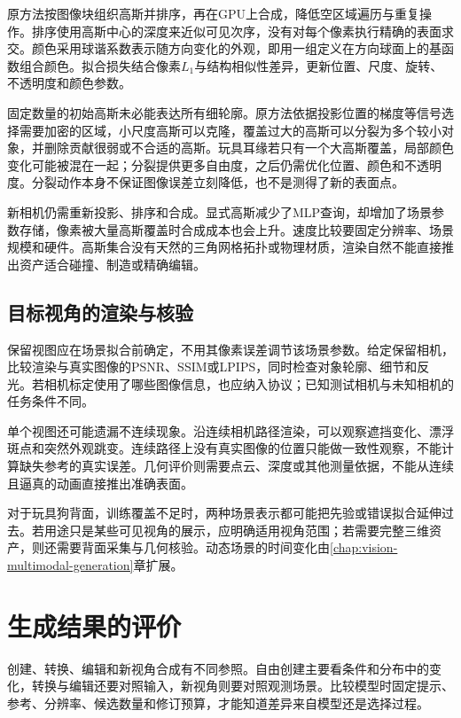 原方法按图像块组织高斯并排序，再在GPU上合成，降低空区域遍历与重复操作。排序使用高斯中心的深度来近似可见次序，没有对每个像素执行精确的表面求交。颜色采用球谐系数表示随方向变化的外观，即用一组定义在方向球面上的基函数组合颜色。拟合损失结合像素$L_1$与结构相似性差异，更新位置、尺度、旋转、不透明度和颜色参数。

固定数量的初始高斯未必能表达所有细轮廓。原方法依据投影位置的梯度等信号选择需要加密的区域，小尺度高斯可以克隆，覆盖过大的高斯可以分裂为多个较小对象，并删除贡献很弱或不合适的高斯。玩具耳缘若只有一个大高斯覆盖，局部颜色变化可能被混在一起；分裂提供更多自由度，之后仍需优化位置、颜色和不透明度。分裂动作本身不保证图像误差立刻降低，也不是测得了新的表面点。

新相机仍需重新投影、排序和合成。显式高斯减少了MLP查询，却增加了场景参数存储，像素被大量高斯覆盖时合成成本也会上升。速度比较要固定分辨率、场景规模和硬件。高斯集合没有天然的三角网格拓扑或物理材质，渲染自然不能直接推出资产适合碰撞、制造或精确编辑。

\subsection{目标视角的渲染与核验}
\label{sec:vision-generation-rendering-check}

保留视图应在场景拟合前确定，不用其像素误差调节该场景参数。给定保留相机，比较渲染与真实图像的PSNR、SSIM或LPIPS，同时检查对象轮廓、细节和反光。若相机标定使用了哪些图像信息，也应纳入协议；已知测试相机与未知相机的任务条件不同。

单个视图还可能遗漏不连续现象。沿连续相机路径渲染，可以观察遮挡变化、漂浮斑点和突然外观跳变。连续路径上没有真实图像的位置只能做一致性观察，不能计算缺失参考的真实误差。几何评价则需要点云、深度或其他测量依据，不能从连续且逼真的动画直接推出准确表面。

对于玩具狗背面，训练覆盖不足时，两种场景表示都可能把先验或错误拟合延伸过去。若用途只是某些可见视角的展示，应明确适用视角范围；若需要完整三维资产，则还需要背面采集与几何核验。动态场景的时间变化由\ref{chap:vision-multimodal-generation}章扩展。

\section{生成结果的评价}
\label{sec:vision-generation-evaluation}

创建、转换、编辑和新视角合成有不同参照。自由创建主要看条件和分布中的变化，转换与编辑还要对照输入，新视角则要对照观测场景。比较模型时固定提示、参考、分辨率、候选数量和修订预算，才能知道差异来自模型还是选择过程。

